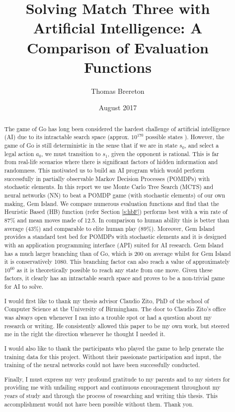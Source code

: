 \documentclass{bhamthesis}
\title{Solving Match Three with Artificial Intelligence: A Comparison of Evaluation Functions}
\author{Thomas Brereton}
\date{August 2017}  %
\makeatletter
\theoremstyle{definition}
\newcommand{\makecrestcover}{%
\begin{titlepage}
\centering\singlespacing
\vspace*{1cm}
{\huge\bfseries University of Birmingham\par}
\vspace*{2cm}
\texttt{[image: crest]}\par
\vspace*{\stretch{1}}
{\Huge\bfseries
\@author\par
\vspace{1cm}
\@title\par}
\vspace*{\stretch{1}}
{\Large\@date\par}
\end{titlepage}
}
\makeatother
\begin{document}
\frontmatter

\maketitle


\begin{abstract}
The game of Go has long been considered the hardest challenge of artificial intelligence (AI) due to its intractable search space (approx. $10^{170}$ possible states \cite{Gelly2012}). However, the game of Go is still deterministic in the sense that if we are in state $s_0$, and select a legal action $a_0$, we must transition to $s_1$, given the opponent is rational. This is far from real-life scenarios where there is significant factors of hidden information and randomness. This motivated us to build an AI program which would perform successfully in partially observable Markov Decision Processes (POMDPs) with stochastic elements. In this report we use Monte Carlo Tree Search (MCTS) and neural networks (NN) to beat a POMDP game (with stochastic elements) of our own making, Gem Island. We compare numerous evaluation functions and find that the Heuristic Based (HB) function (refer Section \ref{s:hbF}) performs best with a win rate of 87\% and mean moves made of 12.5. In comparison to human ability this is better than average (43\%) and comparable to elite human play (89\%). Moreover, Gem Island provides a standard test bed for POMDPs with stochastic elements and it is designed with an application programming interface (API) suited for AI research. Gem Island has a much larger branching than of Go, which is 200 on average \cite{Gelly2006} whilst for Gem Island it is conservatively 1080. This branching factor can also reach a value of approximately $10^{60}$ as it is theoretically possible to reach any state from one move. Given these factors, it clearly has an intractable search space and proves to be a non-trivial game for AI to solve.
\end{abstract}

\renewcommand{\abstractname}{Acknowledgements}
\begin{abstract}
I would first like to thank my thesis advisor Claudio Zito, PhD of the school of Computer Science at the University of Birmingham. The door to Claudio Zito's office was always open whenever I ran into a trouble spot or had a question about my research or writing. He consistently allowed this paper to be my own work, but steered me in the right the direction whenever he thought I needed it.

I would also like to thank the participants who played the game to help generate the training data for this project. Without their passionate participation and input, the training of the neural networks could not have been successfully conducted.

Finally, I must express my very profound gratitude to my parents and to my sisters for providing me with unfailing support and continuous encouragement throughout my years of study and through the process of researching and writing this thesis. This accomplishment would not have been possible without them. Thank you.
\end{abstract}
\end{document}
